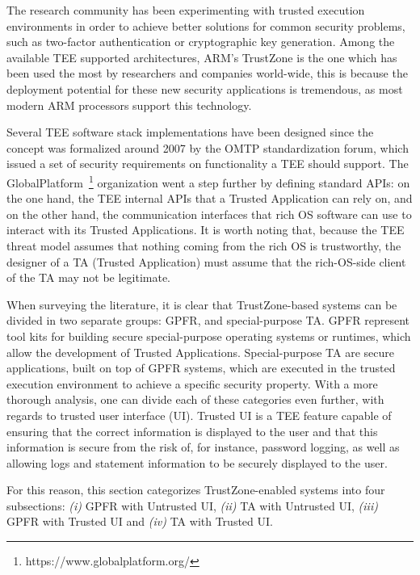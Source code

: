 The research community has been experimenting with trusted execution environments in order to achieve better solutions for common security problems, such as two-factor authentication or cryptographic key generation. Among the available \ac{TEE} supported architectures, ARM's TrustZone is the one which has been used the most by researchers and companies world-wide, this is because the deployment potential for these new security applications is tremendous, as most modern ARM processors support this technology.

Several \ac{TEE} software stack implementations have been designed since the concept was formalized around 2007 by the OMTP standardization forum, which issued a set of security requirements on functionality a TEE should support. The GlobalPlatform~\footnote{https://www.globalplatform.org/} organization went a step further by defining standard APIs: on the one hand, the TEE internal APIs that a Trusted Application can rely on, and on the other hand, the communication interfaces that rich OS software can use to interact with its Trusted Applications. It is worth noting that, because the TEE threat model assumes that nothing coming from the rich OS is trustworthy, the designer of a TA (Trusted Application) must assume that the rich-OS-side client of the TA may not be legitimate.


When surveying the literature, it is clear that TrustZone-based systems can be divided in two separate groups: \ac{GPFR}, and special-purpose \ac{TA}. \ac{GPFR} represent tool kits for building secure special-purpose operating systems or runtimes, which allow the development of Trusted Applications. Special-purpose \ac{TA} are secure applications, built on top of \ac{GPFR} systems, which are executed in the trusted execution environment to achieve a specific security property. With a more thorough analysis, one can divide each of these categories even further, with regards to trusted user interface (UI). Trusted UI is a \ac{TEE} feature capable of ensuring that the correct information is displayed to the user and that this information is secure from the risk of, for instance, password logging, as well as allowing logs and statement information to be securely displayed to the user.

For this reason, this section categorizes TrustZone-enabled systems into four subsections: \emph{(i)} GPFR with Untrusted UI, \emph{(ii)} TA with Untrusted UI, \emph{(iii)} GPFR with Trusted UI and \emph{(iv)} TA with Trusted UI.

